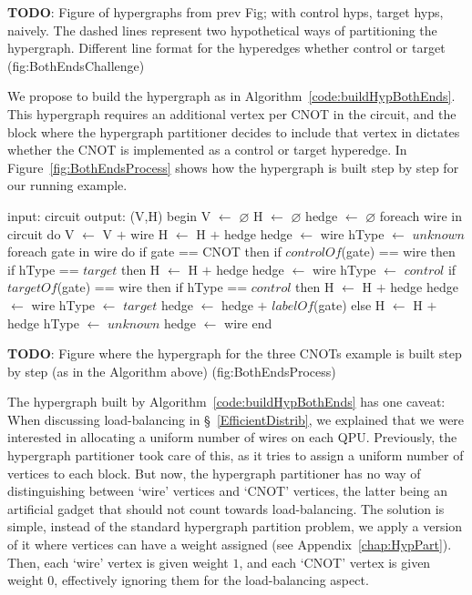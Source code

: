 \textbf{TODO}: Figure of hypergraphs from prev Fig; with control hyps, target hyps, naively. The dashed lines represent two hypothetical ways of partitioning the hypergraph. Different line format for the hyperedges whether control or target (fig:BothEndsChallenge)

We propose to build the hypergraph as in Algorithm~\ref{code:buildHypBothEnds}. This hypergraph requires an additional vertex per CNOT in the circuit, and the block where the hypergraph partitioner decides to include that vertex in dictates whether the CNOT is implemented as a control or target hyperedge. In Figure~\ref{fig:BothEndsProcess} shows how the hypergraph is built step by step for our running example. 

\begin{algorithm}[caption={Builds the hypergraph of a given circuit, without choosing whether CNOT gates are implemented through common control or common target. \(H\) may contain multiple hyperedges connecting the same vertices.}, label={code:buildHypBothEnds}]
input: circuit
output: (V,H)
begin
  V $\gets$ $\varnothing$
  H $\gets$ $\varnothing$
  hedge $\gets$ $\varnothing$
  foreach wire in circuit do
    V $\gets$ V $+$ {wire}
    H $\gets$ H $+$ {hedge}
    hedge $\gets$ {wire}
    hType $\gets$ $unknown$
    foreach gate in wire do
      if gate == CNOT then
        if $controlOf$(gate) == wire then
          if hType == $target$ then
            H $\gets$ H $+$ {hedge}
            hedge $\gets$ {wire}
          hType $\gets$ $control$
        if $targetOf$(gate) == wire then
          if hType == $control$ then
            H $\gets$ H $+$ {hedge}
            hedge $\gets$ {wire}  
          hType $\gets$ $target$
        hedge $\gets$ hedge $+$ {$labelOf$(gate)}
      else
        H $\gets$ H $+$ {hedge}
        hType $\gets$ $unknown$
        hedge $\gets$ {wire}
end
\end{algorithm}

\textbf{TODO}: Figure where the hypergraph for the three CNOTs example is built step by step (as in the Algorithm above) (fig:BothEndsProcess)

The hypergraph built by Algorithm~\ref{code:buildHypBothEnds} has one caveat: When discussing load-balancing in \S~\ref{EfficientDistrib}, we explained that we were interested in allocating a uniform number of wires on each QPU. Previously, the hypergraph partitioner took care of this, as it tries to assign a uniform number of vertices to each block. But now, the hypergraph partitioner has no way of distinguishing between `wire' vertices and `CNOT' vertices, the latter being an artificial gadget that should not count towards load-balancing. The solution is simple, instead of the standard hypergraph partition problem, we apply a version of it where vertices can have a weight assigned (see Appendix~\ref{chap:HypPart}). Then, each `wire' vertex is given weight \(1\), and each `CNOT' vertex is given weight \(0\), effectively ignoring them for the load-balancing aspect.


